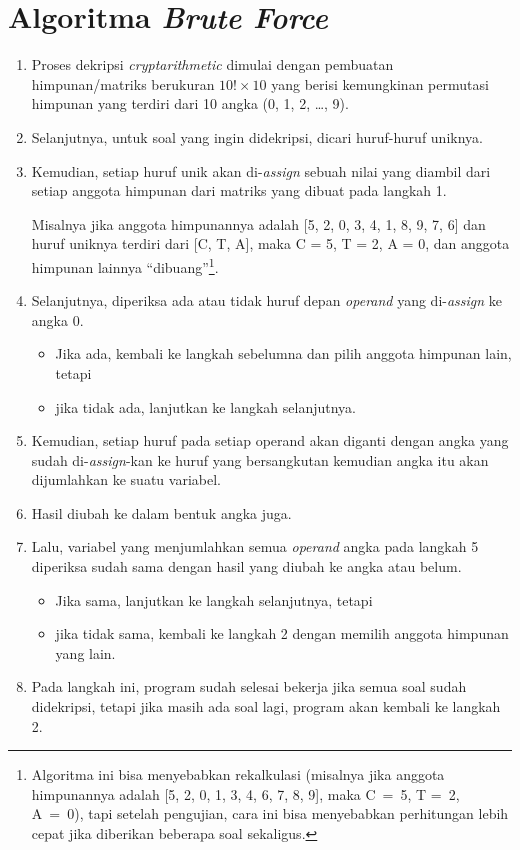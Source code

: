 \documentclass{article}
\begin{document}
\section{Algoritma \textit{Brute Force}}
\begin{enumerate}
  \item Proses dekripsi \textit{cryptarithmetic} dimulai dengan pembuatan
    himpunan/matriks berukuran $10! \times 10$ yang berisi kemungkinan
    permutasi himpunan yang terdiri dari 10 angka (0, 1, 2, \ldots, 9).
  \item Selanjutnya, untuk soal yang ingin didekripsi, dicari huruf-huruf
    uniknya.
  \item Kemudian, setiap huruf unik akan di-\textit{assign} sebuah nilai yang
    diambil dari setiap anggota himpunan dari matriks yang dibuat pada langkah
    1.

    Misalnya jika anggota himpunannya adalah [5, 2, 0, 3, 4, 1, 8, 9,
    7, 6] dan huruf uniknya terdiri dari [C, T, A], maka C = 5, T = 2, A = 0,
    dan anggota himpunan lainnya ``dibuang''\footnote{Algoritma ini bisa
    menyebabkan rekalkulasi (misalnya jika anggota himpunannya adalah [5, 2, 0,
    1, 3, 4, 6, 7, 8, 9], maka C~=~5, T =~2, A~=~0), tapi setelah pengujian,
    cara ini bisa menyebabkan perhitungan lebih cepat jika diberikan beberapa
    soal sekaligus.}.
  \item Selanjutnya, diperiksa ada atau tidak huruf depan \textit{operand} yang
    di-\textit{assign} ke angka 0.
    \begin{itemize}
      \item Jika ada, kembali ke langkah sebelumna dan pilih anggota himpunan
        lain, tetapi
      \item jika tidak ada, lanjutkan ke langkah selanjutnya.
    \end{itemize}
  \item Kemudian, setiap huruf pada setiap operand akan diganti dengan angka
    yang sudah di-\textit{assign}-kan ke huruf yang bersangkutan kemudian angka
    itu akan dijumlahkan ke suatu variabel.
  \item Hasil diubah ke dalam bentuk angka juga.
  \item Lalu, variabel yang menjumlahkan semua \textit{operand} angka
    pada langkah 5 diperiksa sudah sama dengan hasil yang diubah ke angka atau
    belum.
    \begin{itemize}
      \item Jika sama, lanjutkan ke langkah selanjutnya, tetapi
      \item jika tidak sama, kembali ke langkah 2 dengan memilih anggota
        himpunan yang lain.
    \end{itemize}
  \item Pada langkah ini, program sudah selesai bekerja jika semua soal sudah
    didekripsi, tetapi jika masih ada soal lagi, program akan kembali ke
    langkah 2.
\end{enumerate}
\end{document}
